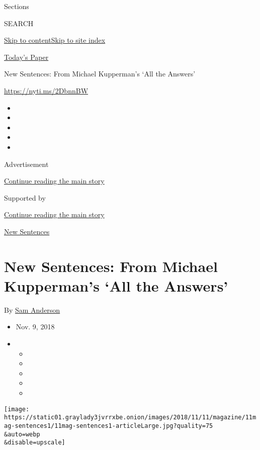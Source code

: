Sections

SEARCH

\protect\hyperlink{site-content}{Skip to
content}\protect\hyperlink{site-index}{Skip to site index}

\href{https://myaccount.nytimes3xbfgragh.onion/auth/login?response_type=cookie\&client_id=vi}{}

\href{https://www.nytimes3xbfgragh.onion/section/todayspaper}{Today's
Paper}

New Sentences: From Michael Kupperman's `All the Answers'

\url{https://nyti.ms/2DbnnBW}

\begin{itemize}
\item
\item
\item
\item
\item
\end{itemize}

Advertisement

\protect\hyperlink{after-top}{Continue reading the main story}

Supported by

\protect\hyperlink{after-sponsor}{Continue reading the main story}

\href{/column/new-sentences}{New Sentences}

\hypertarget{new-sentences-from-michael-kuppermans-all-the-answers}{%
\section{New Sentences: From Michael Kupperman's `All the
Answers'}\label{new-sentences-from-michael-kuppermans-all-the-answers}}

By \href{https://www.nytimes3xbfgragh.onion/by/sam-anderson}{Sam
Anderson}

\begin{itemize}
\item
  Nov. 9, 2018
\item
  \begin{itemize}
  \item
  \item
  \item
  \item
  \item
  \end{itemize}
\end{itemize}

\texttt{[image: https://static01.graylady3jvrrxbe.onion/images/2018/11/11/magazine/11mag-sentences1/11mag-sentences1-articleLarge.jpg?quality=75\\\&auto=webp\\\&disable=upscale]}

